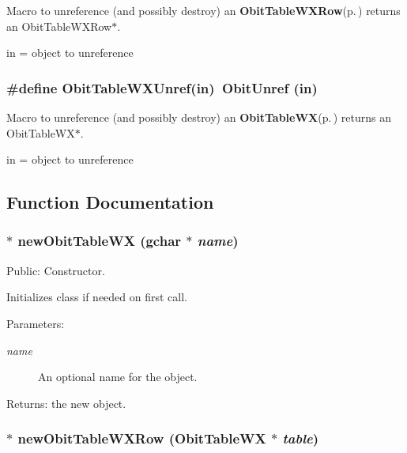 Macro to unreference (and possibly destroy) an {\bf Obit\-Table\-WXRow}{\rm (p.\,\pageref{structObitTableWXRow})} returns an Obit\-Table\-WXRow$\ast$. 

in = object to unreference 
\subsubsection{\setlength{\rightskip}{0pt plus 5cm}\#define Obit\-Table\-WXUnref(in)\ Obit\-Unref (in)}\label{ObitTableWX_8h_a1}


Macro to unreference (and possibly destroy) an {\bf Obit\-Table\-WX}{\rm (p.\,\pageref{structObitTableWX})} returns an Obit\-Table\-WX$\ast$. 

in = object to unreference 

\subsection{Function Documentation}
\subsubsection{$\ast$ new\-Obit\-Table\-WX (gchar $\ast$ {\em name})}\label{ObitTableWX_8h_a11}


Public: Constructor. 

Initializes class if needed on first call. \begin{Desc}
\item[Parameters:]
\begin{description}
\item[{\em name}]An optional name for the object. \end{description}
\end{Desc}
\begin{Desc}
\item[Returns:]the new object. \end{Desc}
\subsubsection{$\ast$ new\-Obit\-Table\-WXRow ({\bf Obit\-Table\-WX} $\ast$ {\em table})}\label{ObitTableWX_8h_a8}


